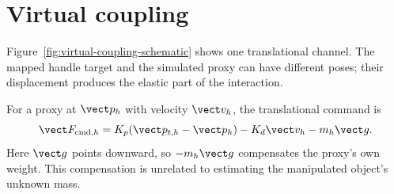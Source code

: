 \section{Virtual coupling}

Figure~\ref{fig:virtual-coupling-schematic} shows one translational channel. The mapped handle target and the simulated proxy can have different poses; their displacement produces the elastic part of the interaction.

For a proxy at $\vect p_h$ with velocity $\vect v_h$, the translational command is
\begin{equation}
\vect F_{\mathrm{cmd},h}=K_p(\vect p_{t,h}-\vect p_h)-K_d\vect v_h-m_h\vect g.
\label{eq:translation-coupling}
\end{equation}
Here $\vect g$ points downward, so $-m_h\vect g$ compensates the proxy's own weight. This compensation is unrelated to estimating the manipulated object's unknown mass.


